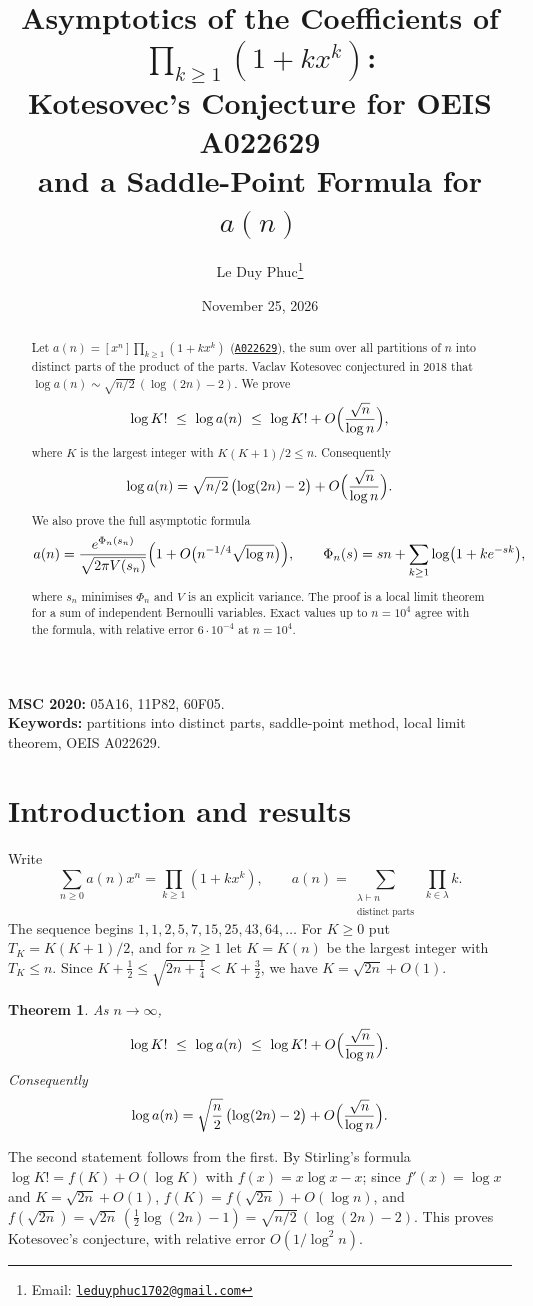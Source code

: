 \documentclass[11pt,a4paper]{article}
\title{Asymptotics of the Coefficients of $\prod_{k\ge1}(1+kx^k)$:\\
Kotesovec's Conjecture for OEIS A022629\\
and a Saddle-Point Formula for $a(n)$}
\author{Le Duy Phuc\thanks{Email: \href{mailto:leduyphuc1702@gmail.com}{\texttt{leduyphuc1702@gmail.com}}}}
\date{November 25, 2026}
\newtheorem{theorem}{Theorem}
\theoremstyle{remark}
\newcommand{\oeis}[1]{\href{https://oeis.org/#1}{\texttt{#1}}}
\begin{document}
\maketitle

\begin{abstract}
Let $a(n)=[x^n]\prod_{k\ge1}(1+kx^k)$ (\oeis{A022629}), the sum over all partitions of $n$ into distinct parts of the product of the parts. Vaclav Kotesovec conjectured in 2018 that $\log a(n)\sim\sqrt{n/2}\,(\log(2n)-2)$. We prove
\[
 \log K!\ \le\ \log a(n)\ \le\ \log K!+O\Bigl(\frac{\sqrt n}{\log n}\Bigr),
\]
where $K$ is the largest integer with $K(K+1)/2\le n$. Consequently
\[
 \log a(n)=\sqrt{n/2}\,\bigl(\log(2n)-2\bigr)+O\Bigl(\frac{\sqrt n}{\log n}\Bigr).
\]
We also prove the full asymptotic formula
\[
 a(n)=\frac{e^{\Phi_n(s_n)}}{\sqrt{2\pi V(s_n)}}\Bigl(1+O\bigl(n^{-1/4}\sqrt{\log n}\bigr)\Bigr),\qquad \Phi_n(s)=sn+\sum_{k\ge1}\log\bigl(1+ke^{-sk}\bigr),
\]
where $s_n$ minimises $\Phi_n$ and $V$ is an explicit variance. The proof is a local limit theorem for a sum of independent Bernoulli variables. Exact values up to $n=10^4$ agree with the formula, with relative error $6\cdot10^{-4}$ at $n=10^4$.
\end{abstract}

\noindent\textbf{MSC 2020:} 05A16, 11P82, 60F05.\\
\textbf{Keywords:} partitions into distinct parts, saddle-point method, local limit theorem, OEIS A022629.

\section{Introduction and results}

Write
\[
 \sum_{n\ge0}a(n)x^n=\prod_{k\ge1}(1+kx^k),\qquad a(n)=\sum_{\substack{\lambda\vdash n\\ \text{distinct parts}}}\ \prod_{k\in\lambda}k .
\]
The sequence begins $1,1,2,5,7,15,25,43,64,\ldots$ For $K\ge0$ put $T_K=K(K+1)/2$, and for $n\ge1$ let $K=K(n)$ be the largest integer with $T_K\le n$. Since $K+\frac12\le\sqrt{2n+\frac14}<K+\frac32$, we have $K=\sqrt{2n}+O(1)$.

\begin{theorem}\label{thm:main}
As $n\to\infty$,
\[
 \log K!\ \le\ \log a(n)\ \le\ \log K!+O\Bigl(\frac{\sqrt n}{\log n}\Bigr).
\]
Consequently
\[
 \log a(n)=\sqrt{\frac n2}\,\bigl(\log(2n)-2\bigr)+O\Bigl(\frac{\sqrt n}{\log n}\Bigr).
\]
\end{theorem}

The second statement follows from the first. By Stirling's formula $\log K!=f(K)+O(\log K)$ with $f(x)=x\log x-x$; since $f'(x)=\log x$ and $K=\sqrt{2n}+O(1)$, $f(K)=f(\sqrt{2n})+O(\log n)$, and $f(\sqrt{2n})=\sqrt{2n}\,(\frac12\log(2n)-1)=\sqrt{n/2}\,(\log(2n)-2)$. This proves Kotesovec's conjecture, with relative error $O(1/\log^2n)$.
\end{document}
